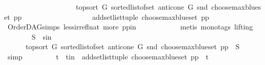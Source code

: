 \begin{isabellebody}
\ \ \ \ \ \ \ \ \ \ \ \ \ \ \ \ \ \ \ \ {\isacharparenleft}{\kern0pt}top{\isacharunderscore}{\kern0pt}sort\ G\ {\isacharparenleft}{\kern0pt}sorted{\isacharunderscore}{\kern0pt}list{\isacharunderscore}{\kern0pt}of{\isacharunderscore}{\kern0pt}set\ {\isacharparenleft}{\kern0pt}anticone\ G\ {\isacharparenleft}{\kern0pt}snd\ {\isacharparenleft}{\kern0pt}choose{\isacharunderscore}{\kern0pt}max{\isacharunderscore}{\kern0pt}blue{\isacharunderscore}{\kern0pt}set\ pp{\isacharparenright}{\kern0pt}{\isacharparenright}{\kern0pt}{\isacharparenright}{\kern0pt}{\isacharparenright}{\kern0pt}{\isacharparenright}{\kern0pt}\isanewline
\ \ \ \ \ \ \ \ \ \ \ \ \ \ \ \ \ \ \ {\isacharparenleft}{\kern0pt}add{\isacharunderscore}{\kern0pt}set{\isacharunderscore}{\kern0pt}list{\isacharunderscore}{\kern0pt}tuple\ {\isacharparenleft}{\kern0pt}choose{\isacharunderscore}{\kern0pt}max{\isacharunderscore}{\kern0pt}blue{\isacharunderscore}{\kern0pt}set\ pp{\isacharparenright}{\kern0pt}{\isacharparenright}{\kern0pt}{\isacharparenright}{\kern0pt}{\isacharparenright}{\kern0pt}{\isachardoublequoteclose}\isanewline
\ \ \ \ \ \ \ \ \ \ \isamarkupfalse%
\ OrderDAG{\isachardot}{\kern0pt}simps\ less{\isacharunderscore}{\kern0pt}irrefl{\isacharunderscore}{\kern0pt}nat\ more\ pp{\isacharunderscore}{\kern0pt}in\isanewline
\ \ \ \ \ \ \ \ \ \ \isamarkupfalse%
\ {\isacharparenleft}{\kern0pt}metis\ {\isacharparenleft}{\kern0pt}mono{\isacharunderscore}{\kern0pt}tags{\isacharcomma}{\kern0pt}\ lifting{\isacharparenright}{\kern0pt}{\isacharparenright}{\kern0pt}\isanewline
\ \ \ \ \ \ \isamarkupfalse%
\ S\ \ s{\isacharunderscore}{\kern0pt}in{\isacharcolon}{\kern0pt}\ \isanewline
\ \ \ \ \ \ {\isachardoublequoteopen}{\isacharparenleft}{\kern0pt}top{\isacharunderscore}{\kern0pt}sort\ G\ {\isacharparenleft}{\kern0pt}sorted{\isacharunderscore}{\kern0pt}list{\isacharunderscore}{\kern0pt}of{\isacharunderscore}{\kern0pt}set\ {\isacharparenleft}{\kern0pt}anticone\ G\ {\isacharparenleft}{\kern0pt}snd\ {\isacharparenleft}{\kern0pt}choose{\isacharunderscore}{\kern0pt}max{\isacharunderscore}{\kern0pt}blue{\isacharunderscore}{\kern0pt}set\ pp{\isacharparenright}{\kern0pt}{\isacharparenright}{\kern0pt}{\isacharparenright}{\kern0pt}{\isacharparenright}{\kern0pt}{\isacharparenright}{\kern0pt}\ {\isacharequal}{\kern0pt}\ S{\isachardoublequoteclose}\ \isamarkupfalse%
\ simp\isanewline
\ \ \ \ \ \ \ \isamarkupfalse%
\ t\ \ t{\isacharunderscore}{\kern0pt}in\ {\isacharcolon}{\kern0pt}\ {\isachardoublequoteopen}{\isacharparenleft}{\kern0pt}add{\isacharunderscore}{\kern0pt}set{\isacharunderscore}{\kern0pt}list{\isacharunderscore}{\kern0pt}tuple\ {\isacharparenleft}{\kern0pt}choose{\isacharunderscore}{\kern0pt}max{\isacharunderscore}{\kern0pt}blue{\isacharunderscore}{\kern0pt}set\ pp{\isacharparenright}{\kern0pt}{\isacharparenright}{\kern0pt}\ {\isacharequal}{\kern0pt}\ t{\isachardoublequoteclose}\ \isamarkupfalse%

\end{isabellebody}
